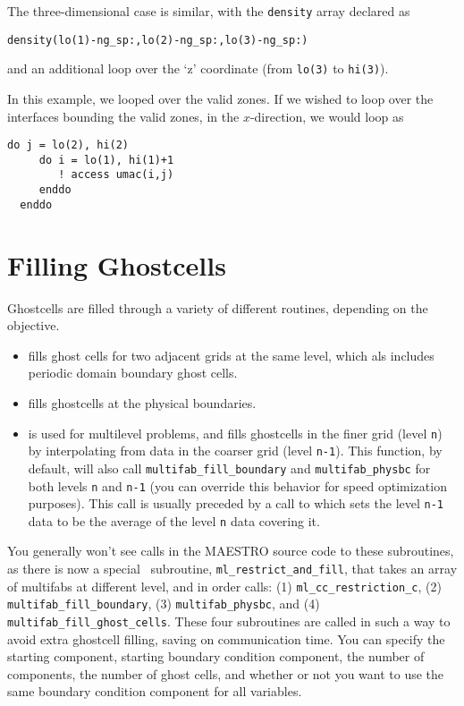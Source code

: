 The three-dimensional case is similar, with the {\tt density} array
declared as 
\begin{lstlisting}[language={[95]fortran},mathescape=false]
  density(lo(1)-ng_sp:,lo(2)-ng_sp:,lo(3)-ng_sp:)
\end{lstlisting}
and an additional loop over the `z' coordinate (from {\tt lo(3)} to
{\tt hi(3)}).

In this example, we looped over the valid zones.  If we wished to loop
over the interfaces bounding the valid zones, in the $x$-direction,
we would loop as
\begin{lstlisting}[language={[95]fortran},mathescape=false]
  do j = lo(2), hi(2)
     do i = lo(1), hi(1)+1
        ! access umac(i,j)
     enddo
  enddo
\end{lstlisting}


\section{Filling Ghostcells}

Ghostcells are filled through a variety of different routines, depending
on the objective.

\begin{itemize}

\item {} fills ghost cells for two
  adjacent grids at the same level, which als includes periodic domain
  boundary ghost cells.

\item {} fills ghostcells at the physical boundaries.

\item {} is used for multilevel
  problems, and fills ghostcells in the finer grid (level {\tt n}) by
  interpolating from data in the coarser grid (level {\tt n-1}).
  This function, by default, will also call {\tt multifab\_fill\_boundary}
  and {\tt multifab\_physbc} for both levels {\tt n} and {\tt n-1} (you 
  can override this behavior for speed optimization purposes).
  This call is usually preceded by a call to 
   which sets the level {\tt n-1} data to be
  the average of the level {\tt n} data covering it.
   
\end{itemize}

You generally won't see calls in the MAESTRO source code to these subroutines,
as there is now a special \amrex\ subroutine, {\tt ml\_restrict\_and\_fill},
that takes an array of multifabs at different level, and in order calls:
(1) {\tt ml\_cc\_restriction\_c}, (2) {\tt multifab\_fill\_boundary},
(3) {\tt multifab\_physbc}, and (4) {\tt multifab\_fill\_ghost\_cells}.
These four subroutines are called in such a way to avoid extra
ghostcell filling, saving on communication time.  You can specify the
starting component, starting boundary condition component, 
the number of components, the number of ghost cells,
and whether or not you want to use the same boundary condition component
for all variables.

